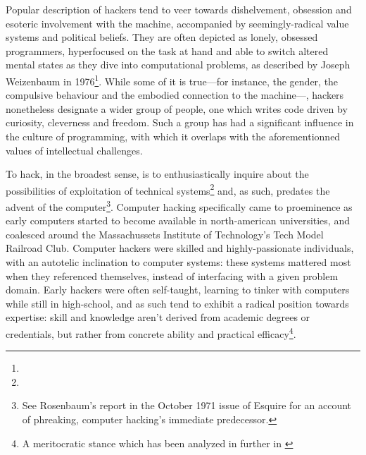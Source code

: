Popular description of hackers tend to veer towards dishelvement, obsession and esoteric involvement with the machine, accompanied by seemingly-radical value systems and political beliefs. They are often depicted as lonely, obsessed programmers, hyperfocused on the task at hand and able to switch altered mental states as they dive into computational problems, as described by Joseph Weizenbaum in 1976\footnote{}. While some of it is true—for instance, the gender, the compulsive behaviour and the embodied connection to the machine—, hackers nonetheless designate a wider group of people, one which writes code driven by curiosity, cleverness and freedom. Such a group has had a significant influence in the culture of programming, with which it overlaps with the aforementionned values of intellectual challenges.

To hack, in the broadest sense, is to enthusiastically inquire about the possibilities of exploitation of technical systems\footnote{} and, as such, predates the advent of the computer\footnote{See Rosenbaum's report in the October 1971 issue of Esquire for an account of phreaking, computer hacking's immediate predecessor\cite{rosenbaum_secrets_2004}.}. Computer hacking specifically came to proeminence as early computers started to become available in north-american universities, and coalesced around the Massachussets Institute of Technology's Tech Model Railroad Club\cite{levy_hackers_2010}. Computer hackers were skilled and highly-passionate individuals, with an autotelic inclination to computer systems: these systems mattered most when they referenced themselves, instead of interfacing with a given problem domain. Early hackers were often self-taught, learning to tinker with computers while still in high-school\cite{lammers_programmers_1986}, and as such tend to exhibit a radical position towards expertise: skill and knowledge aren't derived from academic degrees or credentials, but rather from concrete ability and practical efficacy\footnote{A meritocratic stance which has been analyzed in further in \cite{coleman_aesthetics_2018}}.

